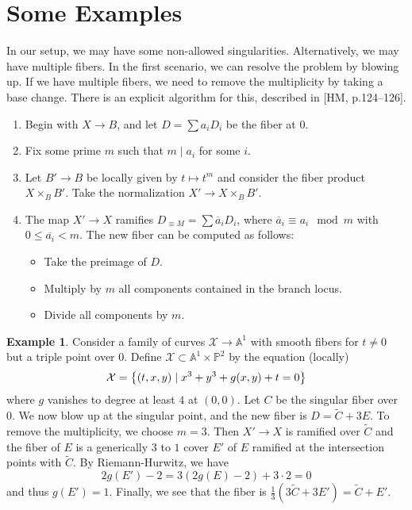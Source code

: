 \documentclass[leqno, openany]{memoir}
\theoremstyle{definition}
\newtheorem{exm}[thm]{Example}
\theoremstyle{remark}
\theoremstyle{plain}
\theoremstyle{definition}
\theoremstyle{remark}
\newcommand{\A}{\mathbb{A}}
\renewcommand{\P}{\mathbb{P}}
\newcommand{\mc}[1]{\mathcal{#1}}
\newcommand{\ol}[1]{\overline{#1}}
\newcommand{\wt}[1]{\widetilde{#1}}
\begin{document}
\section{Some Examples}%
\label{sec:some_examples}

In our setup, we may have some non-allowed singularities. Alternatively, we may have multiple fibers. In the first scenario, we can resolve the problem by blowing up. If we have multiple fibers, we need to remove the multiplicity by taking a base change. There is an explicit algorithm for this, described in [HM, p.124--126].

\begin{enumerate}
    \item Begin with $X \to B$, and let $D = \sum a_i D_i$ be the fiber at $0$.
    \item Fix some prime $m$ such that $m \mid a_i$ for some $i$.
    \item Let $B' \to B$ be locally given by $t \mapsto t^m$ and consider the fiber product $X \times_B B'$. Take the normalization $X' \to X \times_B B'$.
    \item The map $X' \to X$ ramifies $D_{\equiv M} = \sum \ol{a}_i D_i$, where $\ol{a}_i \equiv a_i \mod m$ with $0 \leq \ol{a_i} < m$. The new fiber can be computed as follows:
        \begin{itemize}
            \item Take the preimage of $D$.
            \item Multiply by $m$ all components contained in the branch locus.
            \item Divide all components by $m$.
        \end{itemize}
\end{enumerate}

\begin{exm}
    Consider a family of curves $\mc{X} \to \A^1$ with smooth fibers for $t \neq 0$ but a triple point over $0$. Define $\mc{X} \subset \A^1 \times \P^2$ by the equation (locally)
    \[ \mc{X} = \qty{(t,x,y) \mid x^3 + y^3 + g(x,y) + t = 0} \]
    where $g$ vanishes to degree at least $4$ at $(0,0)$. Let $C$ be the singular fiber over $0$. We now blow up at the singular point, and the new fiber is $D = \wt{C} + 3E$. To remove the multiplicity, we choose $m = 3$. Then $X' \to X$ is ramified over $\wt{C}$ and the fiber of $E$ is a generically $3$ to $1$ cover $E'$ of $E$ ramified at the intersection points with $\wt{C}$. By Riemann-Hurwitz, we have
    \[ 2g(E') - 2 = 3(2g(E)-2) + 3 \cdot 2 = 0 \]
    and thus $g(E') = 1$. Finally, we see that the fiber is $\frac{1}{3} (3 \wt{C} + 3E') = \wt{C} + E'$.
\end{exm}
\end{document}
